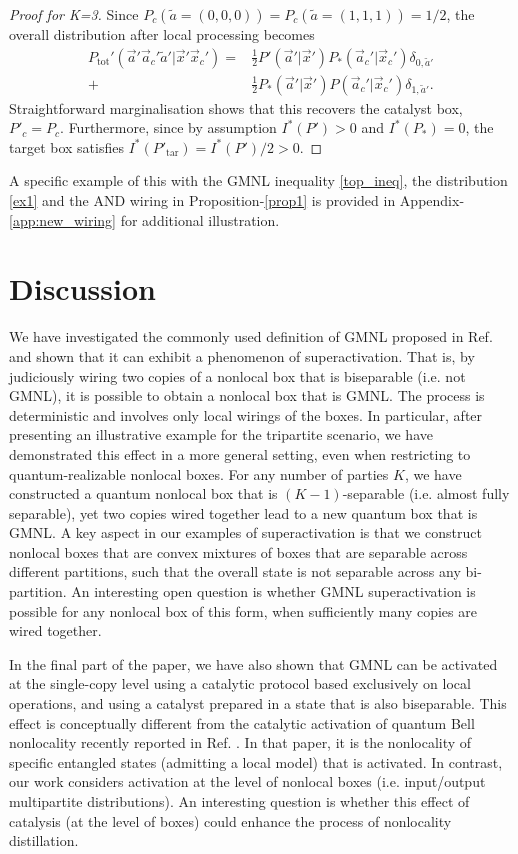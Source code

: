 \documentclass[pra,aps,reprint,superscriptaddress]{revtex4-2}
\theoremstyle{theorem}
\begin{document}
\begin{proof}[Proof for K=3]
 Since $P_c(\tilde a = (0,0,0))=P_c(\tilde a = (1,1,1)) = 1/2$, the overall distribution after local processing becomes 
\begin{align}
    P_{{\mathrm{tot}}}'(\vec a' \vec a_c' \tilde a' | \vec x' \vec x_c')= &\frac{1}{2} P'(\vec a'|\vec x') P_*(\vec a_c' | \vec x_c ') \delta_{0,\tilde a'}\\
    +&\frac{1}{2} P_*(\vec a'|\vec x') P(\vec a_c'|\vec x_c') \delta_{1,\tilde a'} . 
\end{align}
Straightforward marginalisation shows that this recovers the catalyst box, $P'_c = P_c$.
Furthermore, since by assumption $I^*(P') > 0$ and $I^*(P_*) = 0$, the target box satisfies $I^*(P'_{\mathrm{tar}})=I^*(P')/2>0$.
\end{proof}

A specific example of this with the GMNL inequality \eqref{top_ineq}, the distribution \eqref{ex1} and the AND wiring in Proposition-\ref{prop1} is provided in Appendix-\ref{app:new_wiring} for additional illustration.

\section{Discussion}

We have investigated the commonly used definition of GMNL proposed in Ref. \cite{Bancal2013} and shown that it can exhibit a phenomenon of superactivation. That is, by judiciously wiring two copies of a nonlocal box that is biseparable (i.e. not GMNL), it is possible to obtain a nonlocal box that is GMNL. The process is deterministic and involves only local wirings of the boxes. In particular, after presenting an illustrative example for the tripartite scenario, we have demonstrated this effect in a more general setting, even when restricting to quantum-realizable nonlocal boxes. For any number of parties $K$, we have constructed a quantum nonlocal box that is $(K-1)$-separable (i.e. almost fully separable), yet two copies wired together lead to a new quantum box that is GMNL. 
A key aspect in our examples of superactivation is that we construct nonlocal boxes that are convex mixtures of boxes that are separable across different partitions, such that the overall state is not separable across any bi-partition. An interesting open question is whether GMNL superactivation is possible for any nonlocal box of this form, when sufficiently many copies are wired together.


In the final part of the paper, we have also shown that GMNL can be activated at the single-copy level using a catalytic protocol based exclusively on local operations, and using a catalyst prepared in a state that is also biseparable. This effect is conceptually different from the catalytic activation of quantum Bell nonlocality recently reported in Ref. \cite{Bavaresco_2025}. In that paper, it is the nonlocality of specific entangled states (admitting a local model) that is activated. In contrast, our work considers activation at the level of nonlocal boxes (i.e. input/output multipartite distributions). An interesting question is whether this effect of catalysis (at the level of boxes) could enhance the process of nonlocality distillation. 
\end{document}
